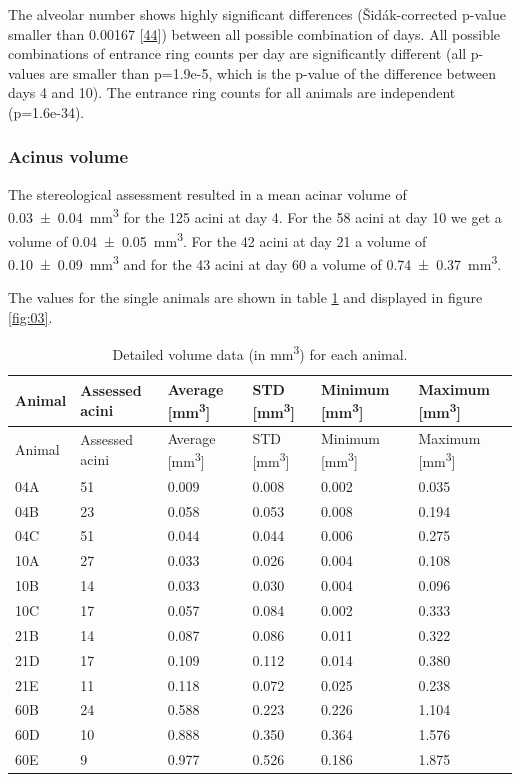 \documentclass[
  american,
]{article}
\begin{document}
The alveolar number shows highly significant differences (Šidák-corrected p-value smaller than 0.00167 {[}\protect\hyperlink{ref-GtCynqsI}{44}{]}) between all possible combination of days.
All possible combinations of entrance ring counts per day are significantly different (all p-values are smaller than p=1.9e-5, which is the p-value of the difference between days 4 and 10).
The entrance ring counts for all animals are independent (p=1.6e-34).

\hypertarget{acinus-volume}{%
\subsubsection{Acinus volume}\label{acinus-volume}}

The stereological assessment resulted in a mean acinar volume of 0.03~±~0.04~mm\textsuperscript{3} for the 125 acini at day 4.
For the 58 acini at day 10 we get a volume of 0.04~±~0.05~mm\textsuperscript{3}.
For the 42 acini at day 21 a volume of 0.10~±~0.09~mm\textsuperscript{3} and for the 43 acini at day 60 a volume of 0.74~±~0.37~mm\textsuperscript{3}.

The values for the single animals are shown in table \ref{tbl:volumes} and displayed in figure \ref{fig:03}.

\begin{longtable}[]{@{}llllll@{}}
\caption{Detailed volume data (in mm\textsuperscript{3}) for each animal. \label{tbl:volumes}}\tabularnewline
\toprule
Animal & Assessed acini & Average {[}mm\textsuperscript{3}{]} & STD {[}mm\textsuperscript{3}{]} & Minimum {[}mm\textsuperscript{3}{]} & Maximum {[}mm\textsuperscript{3}{]}\tabularnewline
\midrule
\endfirsthead
\toprule
Animal & Assessed acini & Average {[}mm\textsuperscript{3}{]} & STD {[}mm\textsuperscript{3}{]} & Minimum {[}mm\textsuperscript{3}{]} & Maximum {[}mm\textsuperscript{3}{]}\tabularnewline
\midrule
\endhead
04A & 51 & 0.009 & 0.008 & 0.002 & 0.035\tabularnewline
04B & 23 & 0.058 & 0.053 & 0.008 & 0.194\tabularnewline
04C & 51 & 0.044 & 0.044 & 0.006 & 0.275\tabularnewline
10A & 27 & 0.033 & 0.026 & 0.004 & 0.108\tabularnewline
10B & 14 & 0.033 & 0.030 & 0.004 & 0.096\tabularnewline
10C & 17 & 0.057 & 0.084 & 0.002 & 0.333\tabularnewline
21B & 14 & 0.087 & 0.086 & 0.011 & 0.322\tabularnewline
21D & 17 & 0.109 & 0.112 & 0.014 & 0.380\tabularnewline
21E & 11 & 0.118 & 0.072 & 0.025 & 0.238\tabularnewline
60B & 24 & 0.588 & 0.223 & 0.226 & 1.104\tabularnewline
60D & 10 & 0.888 & 0.350 & 0.364 & 1.576\tabularnewline
60E & 9 & 0.977 & 0.526 & 0.186 & 1.875\tabularnewline
\bottomrule
\end{longtable}
\end{document}
